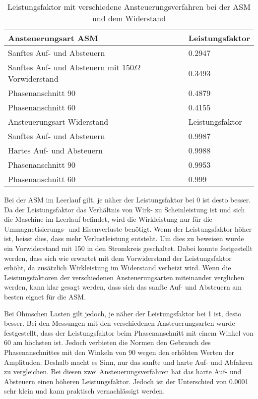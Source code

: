\begin{table}[ht!]
	\centering
	\begin{tabular}{|l|l|}
		\hline
		Ansteuerungsart ASM                                   		& Leistungsfaktor \\ \hline 
		Sanftes Auf- und Absteuern                          		& 0.2947          \\ \hline
		Sanftes Auf- und Absteuern mit 150$\Omega$ Vorwiderstand 	& 0.3493          \\ \hline
		Phasenanschnitt 90\textdegree                               & 0.4879          \\ \hline
		Phasenanschnitt 60\textdegree                               & 0.4155          \\ \hline \hline
		Ansteuerungsart Widerstand                            		& Leistungsfaktor \\ \hline 
		Sanftes Auf- und Absteuern                          		& 0.9987          \\ \hline
		Hartes Auf- und Absteuern                                   & 0.9988          \\ \hline
		Phasenanschnitt 90\textdegree                         		& 0.9953          \\ \hline
		Phasenanschnitt 60\textdegree                         		& 0.999           \\ \hline
	\end{tabular}
\caption{Leistungsfaktor mit verschiedene Ansteuerungsverfahren bei der ASM und dem Widerstand}\label{tab:Leistungsfaktor_ASM_Widerstand}
\end{table}
Bei der ASM im Leerlauf gilt, je näher der Leistungsfaktor bei 0 ist desto besser. Da der Leistungsfaktor das Verhältnis von Wirk- zu Scheinleistung ist und sich die Maschine im Leerlauf befindet, wird die Wirkleistung nur für die Ummagnetisierungs- und Eisenverluste benötigt. Wenn der Leistungsfaktor höher ist, heisst dies, dass mehr Verlustleistung entsteht. Um dies zu beweisen wurde ein Vorwiderstand mit \SI{150}{\Omega} in den Stromkreis geschaltet. Dabei konnte festgestellt werden, dass sich wie erwartet mit dem Vorwiderstand der Leistungsfaktor erhöht, da zusätzlich Wirkleistung im Widerstand verheizt wird. Wenn die Leistungsfaktoren der verschiedenen Ansteuerungsarten miteinander verglichen werden, kann klar gesagt werden, dass sich das sanfte Auf- und  Absteuern am besten eignet für die ASM.

Bei Ohmschen Lasten gilt jedoch, je näher der Leistungsfaktor bei 1 ist, desto besser. Bei den Messungen mit den verschiedenen Ansteuerungsarten wurde festgestellt, dass der Leistungsfaktor beim Phasenanschnitt mit einem Winkel von 60\textdegree \hspace{0.02cm} am höchsten ist. Jedoch verbieten die Normen den Gebrauch des Phasenanschnittes mit den Winkeln von 90\textdegree \hspace{0.02cm} wegen den erhöhten Werten der Amplituden. Deshalb macht es Sinn, nur das sanfte und harte Auf- und Abfahren zu vergleichen. Bei diesen zwei Ansteuerungsverfahren hat das harte Auf- und Absteuern einen höheren Leistungsfaktor. Jedoch ist der Unterschied von 0.0001 sehr klein und kann praktisch vernachlässigt werden.
 



